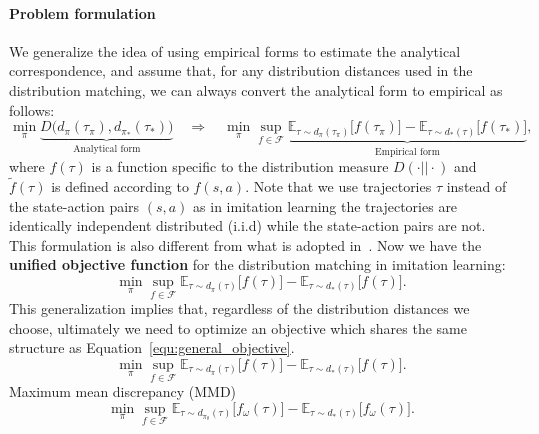 
\paragraph{Problem formulation} We generalize the idea of using empirical forms to estimate the analytical correspondence, and assume that, for any distribution distances used in the distribution matching, we can always convert the analytical form to empirical as follows:
\begin{equation*}
\min_{\pi} \underbrace{D\big(d_{\pi}(\tau_{\pi}), d_{\pi_*}(\tau_{*})\big)}_{\text{Analytical form}} \quad \Rightarrow \quad \min_{\pi} \sup_{f\in\mathcal{F}} \underbrace{ \mathbb{E}_{\tau\sim d_{\pi}(\tau_{\pi})} \big[ f(\tau_{\pi}) \big] - \mathbb{E}_{\tau\sim d_*(\tau)} \big[f(\tau_{*}) \big]}_{\text{Empirical form}},
\end{equation*}
where $f(\tau)$ is a function specific to the distribution measure $D(\cdot||\cdot)$ and $\tilde{f}(\tau)$ is defined according to $f(s, a)$.
Note that we use trajectories $\tau$ instead of the state-action pairs $(s, a)$ as in imitation learning the trajectories are identically independent distributed (i.i.d) while the state-action pairs are not. 
This formulation is also different from what is adopted in~\citep{ke2019imitation,ghasemipour2020divergence}. 
Now we have the \textbf{unified objective function} for the distribution matching in imitation learning:
\begin{equation}\label{equ:general_objective}
\min_{\pi} \sup_{f\in\mathcal{F}} \mathbb{E}_{\tau\sim d_{\pi}(\tau)} \big[ f(\tau) \big] - \mathbb{E}_{\tau\sim d_*(\tau)} \big[f(\tau) \big].
\end{equation}
This generalization implies that, regardless of the distribution distances we choose, ultimately we need to optimize an objective which shares the same structure as Equation~\ref{equ:general_objective}. 
\begin{equation}
\min_{\pi} \sup_{f\in\mathcal{F}} \mathbb{E}_{\tau\sim d_{\pi}(\tau)} \big[ f(\tau) \big] - \mathbb{E}_{\tau\sim d_*(\tau)} \big[f(\tau) \big].
\end{equation}
Maximum mean discrepancy (MMD)~\citep{gretton2007kernel}
\begin{equation}
\min_{\pi} \sup_{f\in\mathcal{F}} \mathbb{E}_{\tau\sim d_{\pi_{\theta}}(\tau)} \big[ f_{\omega}(\tau) \big] - \mathbb{E}_{\tau\sim d_*(\tau)} \big[f_{\omega}(\tau) \big].
\end{equation}

